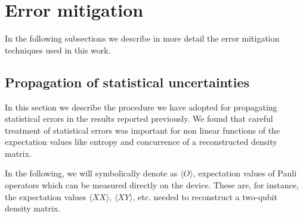 \documentclass[10pt]{article}
\begin{document}
\section{Error mitigation}
\label{app:error_mit}
In the following subsections we describe in more detail the error mitigation techniques used in this work. 

\subsection{Propagation of statistical uncertainties}
\label{app:posterior_sampling}

In this section we describe the procedure we have adopted for propagating statistical errors in the results reported previously. We found that careful treatment of statistical errors was important for non linear functions of the expectation values like entropy and concurrence of a reconstructed density matrix.

In the following, we will symbolically denote as $\langle O\rangle$, expectation values of Pauli operators which can be measured directly on the device. These are, for instance, the expectation values $\langle X X\rangle$, $\langle X Y\rangle$, etc. needed to reconstruct a two-qubit density matrix.
\end{document}
